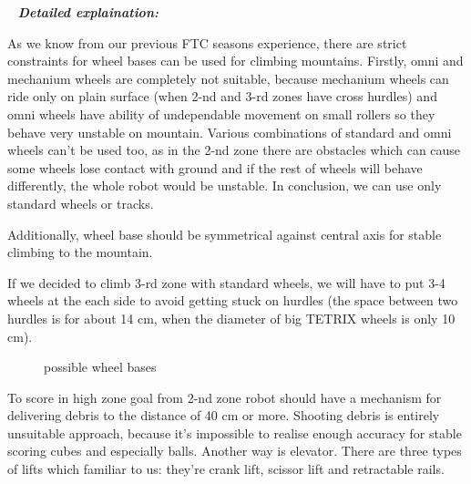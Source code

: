 	 \newline
	\textit{\textbf{Detailed explaination:}}
	\begin{enumerate*}
		\item As we know from our previous FTC seasons experience, there are strict constraints for wheel bases can be used for climbing mountains. Firstly, omni and mechanium wheels are completely not suitable, because mechanium wheels can ride only on plain surface (when 2-nd and 3-rd zones have cross hurdles) and omni wheels have ability of undependable movement on small rollers so they behave very unstable on mountain. Various combinations of standard and omni wheels can't be used too, as in the 2-nd zone there are obstacles which can cause some wheels lose contact with ground and if the rest of wheels will behave differently, the whole robot would be unstable. In conclusion, we can use only standard wheels or tracks.
		
		Additionally, wheel base should be symmetrical against central axis for stable climbing to the mountain.
		
		If we decided to climb 3-rd zone with standard wheels, we will have to put 3-4 wheels at the each side to avoid getting stuck on hurdles (the space between two hurdles is for about 14 cm, when the diameter of big TETRIX wheels is only 10 cm).
		\begin{figure}[H]
			\begin{minipage}[h]{1\linewidth}
				\caption{possible wheel bases}
			\end{minipage}
		\end{figure}
		\item To score in high zone goal from 2-nd zone robot should have a mechanism for delivering debris to the distance of 40 cm or more. Shooting debris is entirely unsuitable approach, because it's impossible to realise enough accuracy for stable scoring cubes and especially balls. Another way is elevator. There are three types of lifts which familiar to us: they're crank lift, scissor lift and retractable rails. 
		

\end{enumerate*}
